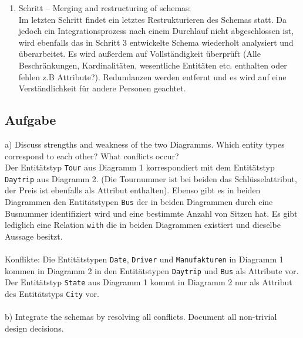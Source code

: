 \documentclass[11pt,a4paper,DIV=9]{scrartcl}
\newcounter{temp}
\newcommand{\aufgabe}[1]{
  \setcounter{temp}{\value{subsection}}
  \setcounter{subsection}{#1}
  \addtocounter{subsection}{-1}
  \subsection{Aufgabe}
  \setcounter{subsection}{\value{temp}}
}
\begin{document}
\begin{enumerate}
    \item Schritt -- Merging and restructuring of schemas: \\
    Im letzten Schritt findet ein letztes Restrukturieren des Schemas statt. Da jedoch ein Integrationsprozess nach einem Durchlauf nicht abgeschlossen ist, wird ebenfalls das in Schritt 3 entwickelte Schema wiederholt analysiert und \"uberarbeitet. Es wird au{\ss}erdem auf Vollst\"andigkeit \"uberpr\"uft (Alle Beschr\"ankungen, Kardinalit\"aten, wesentliche Entit\"aten etc. enthalten oder fehlen z.B Attribute?). Redundanzen werden entfernt und es wird auf eine Verst\"andlichkeit f\"ur andere Personen geachtet.
  \end{enumerate}

\aufgabe{3}
a) Discuss strengths and weakness of the two Diagramms. Which entity types correspond to each other? What conflicts occur? \\ Der Entit\"atstyp \texttt{Tour} aus Diagramm 1 korrespondiert mit dem Entit\"atstyp \texttt{Daytrip} aus Diagramm 2. (Die Tournummer ist bei beiden das Schl\"usselattribut, der Preis ist ebenfalls als Attribut enthalten). Ebenso gibt es in beiden Diagrammen den Entit\"atstypen \texttt{Bus} der in beiden Diagrammen durch eine Busnummer identifiziert wird und eine bestimmte Anzahl von Sitzen hat. Es gibt lediglich eine Relation \texttt{with} die in beiden Diagrammen existiert und dieselbe Aussage besitzt. \\\\
Konflikte: Die Entit\"atstypen \texttt{Date}, \texttt{Driver} und \texttt{Manufakturen} in Diagramm 1 kommen in Diagramm 2 in den Entit\"atstypen \texttt{Daytrip} und \texttt{Bus} als Attribute vor. Der Entit\"atstyp \texttt{State} aus Diagramm 1 kommt in Diagramm 2 nur als Attribut des Entit\"atstyps \texttt{City} vor.
\\\\
b) Integrate the schemas by resolving all conflicts. Document all non-trivial design decisions. \\
\end{document}
